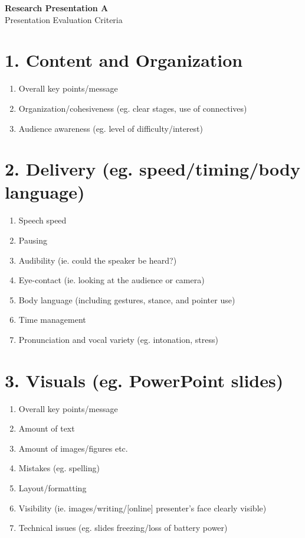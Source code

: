 \documentclass[12pt,a4paper]{article}
\begin{document}
\large

\begin{center}
{\LARGE \textbf{Research Presentation A}}\\[0.45em]
{\Large Presentation Evaluation Criteria}
\end{center}

\vspace{0.2em}

\section*{1. Content and Organization}

\begin{enumerate}[label=\roman*)]
  \item Overall key points/message
  \item Organization/cohesiveness (eg. clear stages, use of connectives)
  \item Audience awareness (eg. level of difficulty/interest)
\end{enumerate}

\section*{2. Delivery (eg. speed/timing/body language)}

\begin{enumerate}[label=\roman*)]
  \item Speech speed
  \item Pausing
  \item Audibility (ie. could the speaker be heard?)
  \item Eye-contact (ie. looking at the audience or camera)
  \item Body language (including gestures, stance, and pointer use)
  \item Time management
  \item Pronunciation and vocal variety (eg. intonation, stress)
\end{enumerate}

\section*{3. Visuals (eg. PowerPoint slides)}

\begin{enumerate}[label=\roman*)]
  \item Overall key points/message
  \item Amount of text
  \item Amount of images/figures etc.
  \item Mistakes (eg. spelling)
  \item Layout/formatting
  \item Visibility (ie. images/writing/[online] presenter's face clearly visible)
  \item Technical issues (eg. slides freezing/loss of battery power)
\end{enumerate}
\end{document}
